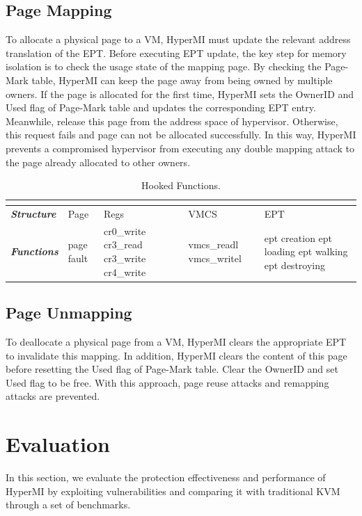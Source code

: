 \documentclass[conference]{IEEEtran}
\begin{document}
\subsection {Page Mapping}

To allocate a physical page to a VM, HyperMI must update the relevant address translation of the EPT.
Before executing EPT update, the key step for memory isolation is to check the usage state of the mapping page. 
By checking the Page-Mark table, HyperMI can keep the page away from being owned by multiple owners. If the page is allocated for the first time, HyperMI sets the OwnerID and Used flag of Page-Mark table and updates the corresponding EPT entry. Meanwhile, release this page from the address space of hypervisor. Otherwise, this request fails and page can not be allocated successfully. In this way, HyperMI prevents a compromised hypervisor from executing any double mapping attack to the page already allocated to other owners.


\begin{table}
\centering
\caption{Hooked Functions.}\label{tabhook}
\begin{tabular}{p{1cm}|p{1.2cm}|p{1.1cm}|p{1.4cm}|p{1.6cm}}
\hline
\multicolumn{5}{c}{\bfseries\textbf\centering{Hooked Functions}}\\
\hline
{\itshape\bfseries Structure} & Page & Regs & VMCS & EPT \\
\hline
{\itshape\bfseries Functions} &page fault & cr0\_write cr3\_read cr3\_write cr4\_write & vmcs\_readl vmcs\_writel & ept creation ept loading ept walking ept destroying \\
\hline
\end{tabular}
\end{table}

\subsection {Page Unmapping}

To deallocate a physical page from a VM, HyperMI clears the appropriate EPT to invalidate this mapping. In addition, HyperMI clears the content of this page before resetting the Used flag of Page-Mark table. Clear the OwnerID and set Used flag to be free. With this approach, page reuse attacks and remapping attacks are prevented.
\fi


\section{Evaluation}\label{sec:evaluation}
In this section, we evaluate the protection effectiveness and performance of HyperMI by exploiting vulnerabilities and comparing it with traditional KVM through a set of benchmarks.
\end{document}

